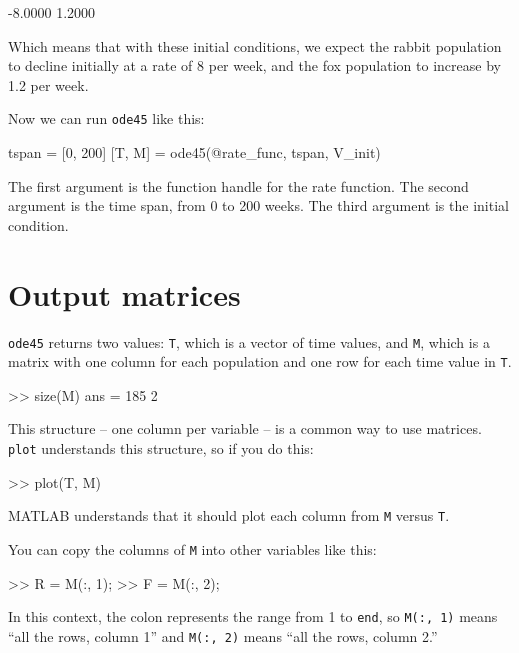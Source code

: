 \begin{code}
-8.0000
 1.2000
 \end{code}
  
Which means that with these initial conditions, we expect the rabbit population to decline initially at a rate of 8 per week, and the fox population to increase by 1.2 per week.  
  
Now we can run {\tt ode45} like this:

\begin{code}
tspan = [0, 200]
[T, M] = ode45(@rate_func, tspan, V_init)
\end{code}

The first argument is the function handle for the rate function.
The second argument is the time span, from 0 to 200 weeks.
The third argument is the initial condition.



\section{Output matrices}

{\tt ode45} returns two values: {\tt T}, which is a vector of time values, and {\tt M}, which is a matrix with one column for each
population and one row for each time value in {\tt T}.

\begin{code}
>> size(M)
ans = 185     2
\end{code}

This structure -- one column per variable -- is a common way to
use matrices.  {\tt plot} understands this structure, so if you
do this:

\begin{code}
>> plot(T, M)
\end{code}

MATLAB understands that it should plot each column from {\tt M}
versus {\tt T}.


You can copy the columns of {\tt M} into other variables like
this:

\begin{code}
>> R = M(:, 1);
>> F = M(:, 2);
\end{code}

In this context, the colon represents the range from 1 to {\tt end},
so {\tt M(:, 1)} means ``all the rows, column 1'' and
{\tt M(:, 2)} means ``all the rows, column 2.''

